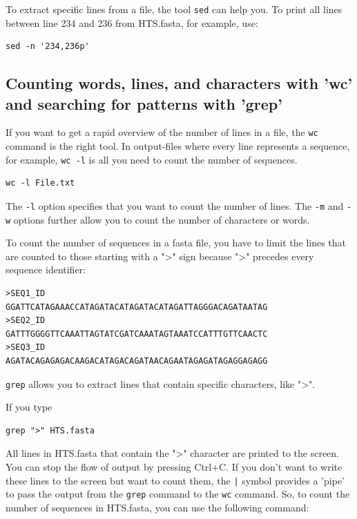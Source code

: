 \documentclass[11pt]{article}
\begin{document}
To extract specific lines from a file, the tool \texttt{sed} can help you. To
print all lines between line 234 and 236 from HTS.fasta, for example, use:

\begin{verbatim}
sed -n '234,236p'
\end{verbatim}


\subsection{Counting words, lines, and characters with 'wc' and searching for patterns with 'grep'}
\label{sec:orgheadline21}
If you want to get a rapid overview of the number of lines in a file,
the \texttt{wc} command is the right tool. In output-files where
every line represents a sequence, for example, \texttt{wc -l} is all you need to count the
number of sequences.

\begin{verbatim}
wc -l File.txt
\end{verbatim}

The \texttt{-l} option specifies that you want to count the number of
lines. The \texttt{-m} and \texttt{-w} options further allow you to count the number
of characters or words.


To count the number of sequences in a fasta file, you have to limit
the lines that are counted to those starting with a ">" sign
because ">" precedes every sequence identifier:

\begin{verbatim}
>SEQ1_ID
GGATTCATAGAAACCATAGATACATAGATACATAGATTAGGGACAGATAATAG
>SEQ2_ID
GATTTGGGGTTCAAATTAGTATCGATCAAATAGTAAATCCATTTGTTCAACTC
>SEQ3_ID
AGATACAGAGAGACAAGACATAGACAGATAACAGAATAGAGATAGAGGAGAGG
\end{verbatim}

\texttt{grep} allows you to extract lines that contain specific
characters, like ">". 


If you type

\begin{verbatim}
grep ">" HTS.fasta
\end{verbatim}

All lines in HTS.fasta that contain the ">" character are printed to
the screen. You can stop the flow of output by pressing Ctrl+C. If you
don't want to write these lines to the screen but want to count them,
the \texttt{|} symbol provides a 'pipe' to pass the output from the \texttt{grep}
command to the \texttt{wc} command. So, to count the number of
sequences in HTS.fasta, you can use the following command:
\end{document}
